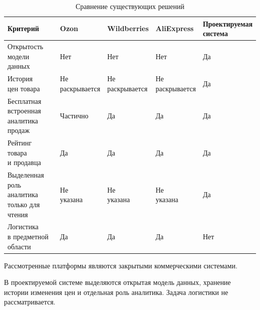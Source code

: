 \begin{table}[h!]
    \caption{Сравнение существующих решений}
    \label{tbl:comparison}
    \centering
    \small
    \begin{tabular}{|l|l|l|l|l|}
        \hline
        \textbf{Критерий} & \textbf{Ozon} & \textbf{Wildberries} & \textbf{AliExpress} & \makecell[l]{\textbf{Проектируемая}\\\textbf{система}} \\ \hline
        \makecell[l]{Открытость\\модели данных} & Нет & Нет & Нет & Да \\ \hline
        \makecell[l]{История\\цен товара} & \makecell[l]{Не\\раскрывается} & \makecell[l]{Не\\раскрывается} & \makecell[l]{Не\\раскрывается} & Да \\ \hline
        \makecell[l]{Бесплатная встроенная\\аналитика продаж} & Частично & Да & Да & Да \\ \hline
        \makecell[l]{Рейтинг товара\\и продавца} & Да & Да & Да & Да \\ \hline
        \makecell[l]{Выделенная роль\\аналитика\\только для чтения} & \makecell[l]{Не\\указана} & \makecell[l]{Не\\указана} & \makecell[l]{Не\\указана} & Да \\ \hline
        \makecell[l]{Логистика\\в предметной\\области} & Да & Да & Да & Нет \\ \hline
    \end{tabular}
\end{table}

Рассмотренные платформы являются закрытыми коммерческими системами.

В проектируемой системе выделяются открытая модель данных, хранение истории изменения цен и отдельная роль аналитика. Задача логистики не рассматривается.
